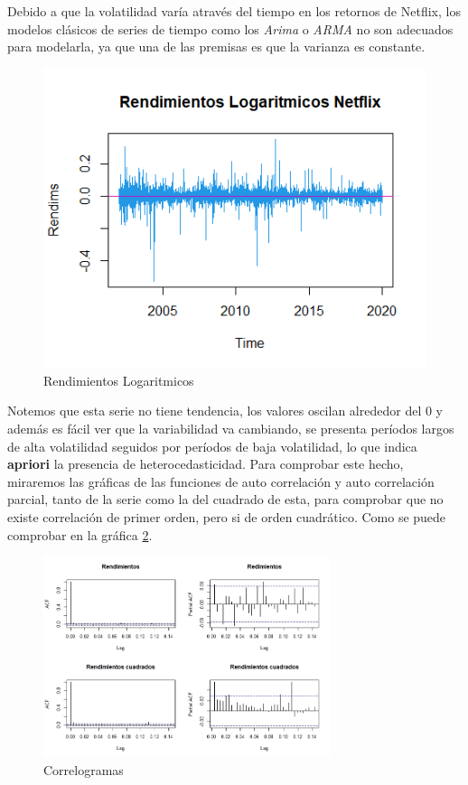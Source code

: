 \bigskip
Debido a que la volatilidad varía através del tiempo en  los retornos de Netflix, los modelos clásicos de series de tiempo como los \textit{Arima } o \textit{ARMA} no son adecuados para modelarla, ya que una de las premisas es que la varianza es constante.

\begin{figure}[!ht]
    \centering
    \includegraphics[scale=.75]{Graficos/RendimientosLog.png}
    \caption{Rendimientos Logaritmicos}
    \label{Rendimientos Logaritmicos}
\end{figure}

Notemos que esta serie no tiene tendencia, los valores oscilan alrededor del 0 y además es fácil ver que la variabilidad va cambiando, se presenta períodos largos de alta volatilidad seguidos por períodos de baja volatilidad, lo que indica \textbf{apriori} la presencia de heterocedasticidad. Para comprobar este hecho, miraremos las gráficas de las funciones de auto correlación y auto correlación parcial, tanto de la serie como la del cuadrado de esta, para comprobar que no existe correlación de primer orden, pero si de orden cuadrático. Como se puede comprobar en la gráfica \ref{ACF}.


\begin{figure}[ht]
    \centering
    \includegraphics[width=0.75\textwidth]{Graficos/ACFRendi.jpeg}
    \caption{Correlogramas}
    \label{ACF}
\end{figure}


